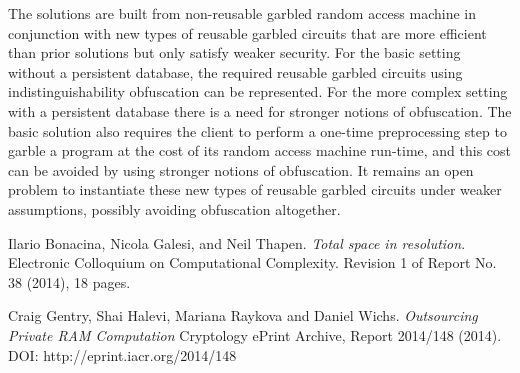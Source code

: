 \documentclass{article}
\begin{document}
The solutions are built from non-reusable garbled random access machine in conjunction with new types of reusable garbled circuits that are more efficient than prior solutions but only satisfy weaker security. For the basic setting without a persistent database, the required reusable garbled circuits using indistinguishability obfuscation can be represented. For the more complex setting with a persistent database there is a need for stronger notions of obfuscation. The basic solution also requires the client to perform a one-time preprocessing step to garble a program at the cost of its random access machine run-time, and this cost can be avoided by using stronger notions of obfuscation. It remains an open problem to instantiate these new types of reusable garbled circuits under weaker assumptions, possibly avoiding obfuscation altogether.

\begin{thebibliography}{9}
Ilario Bonacina, Nicola Galesi, and Neil Thapen. 
\textit{Total space in resolution}.
Electronic Colloquium on Computational Complexity. Revision 1 of Report No. 38 (2014), 18 pages.

Craig Gentry, Shai Halevi, Mariana Raykova and Daniel Wichs.
\textit{Outsourcing Private RAM Computation}
Cryptology ePrint Archive, Report 2014/148 (2014).
DOI: http://eprint.iacr.org/2014/148
\end{thebibliography}
\end{document}
